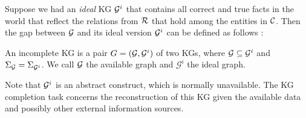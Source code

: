 


Suppose we had an \emph{ideal} KG $\mathcal{G}^i$ that contains all correct and true facts in the world that reflect the relations from $\mathcal{R}$ that hold among the entities in $\mathcal{C}$. Then the gap between $\mathcal{G}$ and its ideal version $\mathcal{G}^i$ can be defined as follows \cite{rdfcomp}: 

\begin{definition} An incomplete KG is a pair
    $G = (\mathcal{G}, \mathcal{G}^i)$ of two KGs, where $\mathcal{G}\subseteq \mathcal{G}^i$ and
    $\Sigma_{\mathcal{G}}=\Sigma_{\mathcal{G}^i}$. We call $\mathcal{G}$ the available
    graph and $\mathcal{G}^i$ the ideal graph.  \end{definition}
    
Note that $\mathcal{G}^i$ is an abstract construct, which is normally unavailable. The KG completion task concerns the reconstruction of this KG given the available data and possibly other external information sources.


